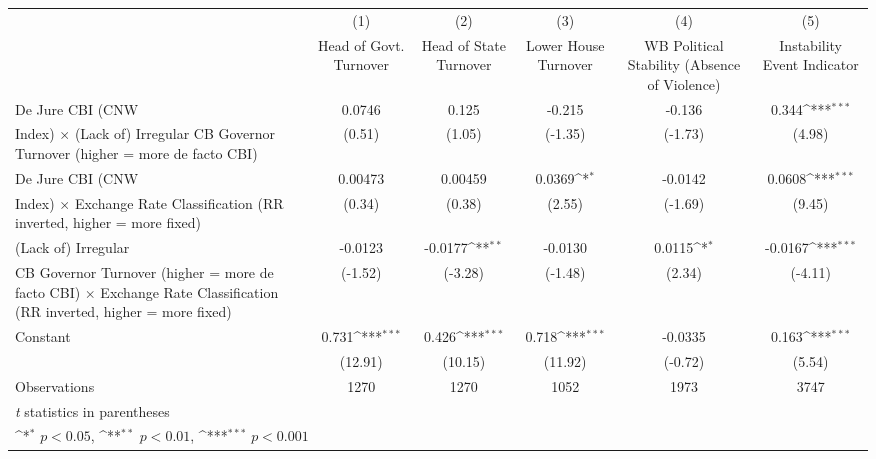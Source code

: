 {
\def\sym#1{\ifmmode^{#1}\else\(^{#1}\)\fi}
\begin{tabular}{l*{5}{c}}
\hline\hline
                    &\multicolumn{1}{c}{(1)}&\multicolumn{1}{c}{(2)}&\multicolumn{1}{c}{(3)}&\multicolumn{1}{c}{(4)}&\multicolumn{1}{c}{(5)}\\
                    &\multicolumn{1}{c}{Head of Govt. Turnover}&\multicolumn{1}{c}{Head of State Turnover}&\multicolumn{1}{c}{Lower House Turnover}&\multicolumn{1}{c}{WB Political Stability (Absence of Violence)}&\multicolumn{1}{c}{Instability Event Indicator}\\
\hline
De Jure CBI (CNW    &      0.0746         &       0.125         &      -0.215         &      -0.136         &       0.344\sym{***}\\
Index) $\times$ (Lack of) Irregular CB Governor Turnover (higher = more de facto CBI)&      (0.51)         &      (1.05)         &     (-1.35)         &     (-1.73)         &      (4.98)         \\
[1em]
De Jure CBI (CNW    &     0.00473         &     0.00459         &      0.0369\sym{*}  &     -0.0142         &      0.0608\sym{***}\\
Index) $\times$ Exchange Rate Classification (RR inverted, higher = more fixed)&      (0.34)         &      (0.38)         &      (2.55)         &     (-1.69)         &      (9.45)         \\
[1em]
(Lack of) Irregular &     -0.0123         &     -0.0177\sym{**} &     -0.0130         &      0.0115\sym{*}  &     -0.0167\sym{***}\\
CB Governor Turnover (higher = more de facto CBI) $\times$ Exchange Rate Classification (RR inverted, higher = more fixed)&     (-1.52)         &     (-3.28)         &     (-1.48)         &      (2.34)         &     (-4.11)         \\
[1em]
Constant            &       0.731\sym{***}&       0.426\sym{***}&       0.718\sym{***}&     -0.0335         &       0.163\sym{***}\\
                    &     (12.91)         &     (10.15)         &     (11.92)         &     (-0.72)         &      (5.54)         \\
\hline
Observations        &        1270         &        1270         &        1052         &        1973         &        3747         \\
\hline\hline
\multicolumn{6}{l}{\footnotesize \textit{t} statistics in parentheses}\\
\multicolumn{6}{l}{\footnotesize \sym{*} \(p<0.05\), \sym{**} \(p<0.01\), \sym{***} \(p<0.001\)}\\
\end{tabular}
}
